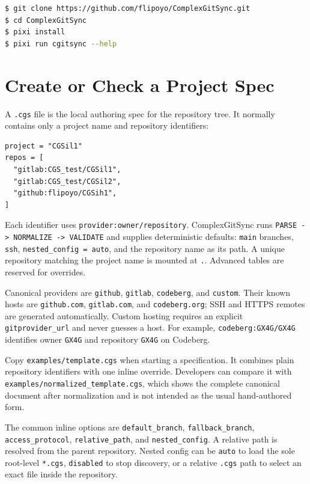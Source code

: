 \begin{lstlisting}[language=bash]
$ git clone https://github.com/flipoyo/ComplexGitSync.git
$ cd ComplexGitSync
$ pixi install
$ pixi run cgitsync --help
\end{lstlisting}

\section{Create or Check a Project Spec}

A \texttt{.cgs} file is the local authoring spec for the repository tree. It
normally contains only a project name and repository identifiers:

\begin{lstlisting}
project = "CGSil1"
repos = [
  "gitlab:CGS_test/CGSil1",
  "gitlab:CGS_test/CGSil2",
  "github:flipoyo/CGSih1",
]
\end{lstlisting}

Each identifier uses \texttt{provider:owner/repository}.  ComplexGitSync runs
\texttt{PARSE -> NORMALIZE -> VALIDATE} and supplies deterministic defaults:
\texttt{main} branches, \texttt{ssh}, \texttt{nested\_config = auto}, and the
repository name as its path.  A unique repository matching the project name
is mounted at \texttt{.}.  Advanced tables are reserved for overrides.

Canonical providers are \texttt{github}, \texttt{gitlab},
\texttt{codeberg}, and \texttt{custom}. Their known hosts are
\texttt{github.com}, \texttt{gitlab.com}, and \texttt{codeberg.org}; SSH and
HTTPS remotes are generated automatically. Custom hosting requires an explicit
\texttt{gitprovider\_url} and never guesses a host. For example,
\texttt{codeberg:GX4G/GX4G} identifies owner \texttt{GX4G} and repository
\texttt{GX4G} on Codeberg.

Copy \texttt{examples/template.cgs} when starting a specification. It combines
plain repository identifiers with one inline override. Developers can compare
it with \texttt{examples/normalized\_template.cgs}, which shows the complete
canonical document after normalization and is not intended as the usual
hand-authored form.

The common inline options are \texttt{default\_branch},
\texttt{fallback\_branch}, \texttt{access\_protocol},
\texttt{relative\_path}, and \texttt{nested\_config}. A relative path is
resolved from the parent repository. Nested config can be \texttt{auto} to
load the sole root-level \texttt{*.cgs}, \texttt{disabled} to stop discovery,
or a relative \texttt{.cgs} path to select an exact file inside the repository.

